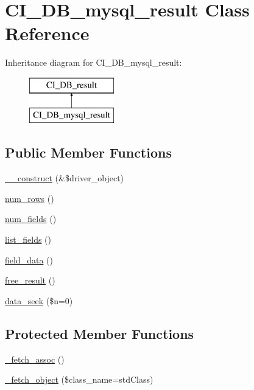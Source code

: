 \hypertarget{class_c_i___d_b__mysql__result}{}\section{C\+I\+\_\+\+D\+B\+\_\+mysql\+\_\+result Class Reference}
\label{class_c_i___d_b__mysql__result}
Inheritance diagram for C\+I\+\_\+\+D\+B\+\_\+mysql\+\_\+result\+:\begin{figure}[H]
\begin{center}
\leavevmode
\includegraphics[height=2.000000cm]{class_c_i___d_b__mysql__result}
\end{center}
\end{figure}
\subsection*{Public Member Functions}
\begin{DoxyCompactItemize}
\item 
\mbox{\hyperlink{class_c_i___d_b__mysql__result_af1aa078f9aefff4e64d27ae3d174a6a8}{\+\_\+\+\_\+construct}} (\&\$driver\+\_\+object)
\item 
\mbox{\hyperlink{class_c_i___d_b__mysql__result_a75ec363a9bcaebca4095cdce5539c96c}{num\+\_\+rows}} ()
\item 
\mbox{\hyperlink{class_c_i___d_b__mysql__result_a416cb54689baef28bac9d58e403b34f0}{num\+\_\+fields}} ()
\item 
\mbox{\hyperlink{class_c_i___d_b__mysql__result_a469f9ace4c6ca39b38f24ea64455da0b}{list\+\_\+fields}} ()
\item 
\mbox{\hyperlink{class_c_i___d_b__mysql__result_acaeac05e0290320845055aa3cd0874d5}{field\+\_\+data}} ()
\item 
\mbox{\hyperlink{class_c_i___d_b__mysql__result_ab71323a111af3a11d9e28241bf221687}{free\+\_\+result}} ()
\item 
\mbox{\hyperlink{class_c_i___d_b__mysql__result_a11f50d6f7a4cc3d953bed4c2f91151e8}{data\+\_\+seek}} (\$n=0)
\end{DoxyCompactItemize}
\subsection*{Protected Member Functions}
\begin{DoxyCompactItemize}
\item 
\mbox{\hyperlink{class_c_i___d_b__mysql__result_a006453d356bca95a5007278abcc92590}{\+\_\+fetch\+\_\+assoc}} ()
\item 
\mbox{\hyperlink{class_c_i___d_b__mysql__result_a1904744acf38d4c7ffb4787277da069b}{\+\_\+fetch\+\_\+object}} (\$class\+\_\+name=\textquotesingle{}std\+Class\textquotesingle{})
\end{DoxyCompactItemize}
